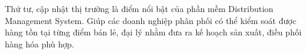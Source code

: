 Thứ tư, cập nhật thị trường là điểm nổi bật của phần mềm 
Distribution Management System. Giúp các doanh nghiệp phân phối có thể
kiểm soát được hàng tồn tại từng điểm bán lẻ, đại lý nhằm
đưa ra kế hoạch sản xuất, điều phối hàng hóa phù hợp.







